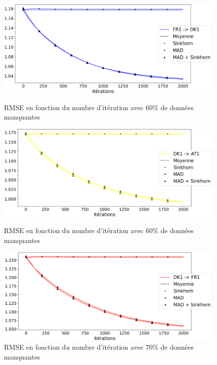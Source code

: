 \documentclass[acmsmall, natbib=false, nonacm]{acmart}
\begin{document}
\begin{figure}[H]
    \begin{minipage}[b]{0.4\linewidth}
		\centering \includegraphics[scale=0.14]{images/60_ar_DK1.png}
		\caption{RMSE en fonction du nombre d'itération avec 60\% de données manquantes}
	\end{minipage}\hfill
    \begin{minipage}[b]{0.4\linewidth}
		\centering \includegraphics[scale=0.14]{images/60_ar_AT1.png}
		\caption{RMSE en fonction du nombre d'itération avec 60\% de données manquantes}
	\end{minipage}\hfill
    \begin{minipage}[b]{0.4\linewidth}
		\centering \includegraphics[scale=0.14]{images/70_ar_FR1.png}
		\caption{RMSE en fonction du nombre d'itération avec 70\% de données manquantes}
	\end{minipage}\hfill

\end{figure}
\end{document}
